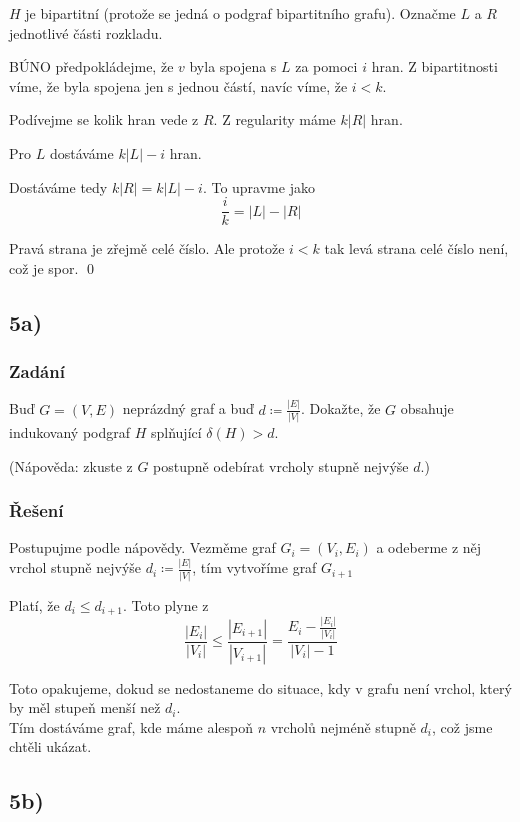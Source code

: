 \documentclass[../main.tex]{subfiles}
\begin{document}
$H$ je bipartitní (protože se jedná o podgraf bipartitního grafu). Označme $L$ a $R$ jednotlivé části rozkladu.

BÚNO předpokládejme, že $v$ byla spojena s $L$ za pomoci $i$ hran. Z bipartitnosti víme, že byla spojena jen s jednou částí, navíc víme, že $i<k$.


Podívejme se kolik hran vede z $R$. Z regularity máme $k|R|$ hran. 

Pro $L$ dostáváme $k|L| - i$ hran.  


Dostáváme tedy $k|R| = k|L| - i$. To upravme jako 
\begin{equation*}
    \frac{i}{k} = |L| - |R|
\end{equation*}


Pravá strana je zřejmě celé číslo. Ale protože $i<k$ tak levá strana celé číslo není, což je spor. 
\qed


\subsection{5a)}
\subsubsection*{Zadání}
Buď $G=(V,E)$ neprázdný graf a buď $d \coloneq \frac{|E|}{|V|}$. 
Dokažte, že $G$ obsahuje indukovaný podgraf $H$ splňující $\delta(H) > d$.

(Nápověda: zkuste z $G$ postupně odebírat vrcholy stupně nejvýše $d$.)

\subsubsection*{Řešení}

Postupujme podle nápovědy. Vezměme graf $G_i = (V_i, E_i)$ a 
odeberme z něj vrchol stupně nejvýše $d_i \coloneq \frac{|E|}{|V|}$, tím vytvoříme graf $G_{i+1}$

Platí, že $d_i \leq d_{i+1}$. Toto plyne z
\begin{equation*}
    \frac{|E_i|}{|V_i|} \leq \frac{|E_{i+1}|}{|V_{i+1}|} = \frac{E_{i} - \frac{|E_i|}{|V_i|}}{|V_i| - 1} 
\end{equation*}

Toto opakujeme, dokud se nedostaneme do situace, kdy v grafu není vrchol, který by měl stupeň menší než $d_i$.\\
Tím dostáváme graf, kde máme alespoň $n$ vrcholů nejméně stupně $d_i$, což jsme chtěli ukázat. 


\subsection{5b)}
\end{document}
